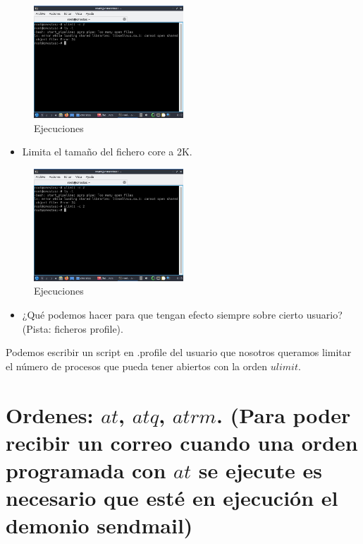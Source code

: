 \documentclass[12pt]{article}
\begin{document}
\begin{figure}[h]
    \centering
    \includegraphics[width=0.5\textwidth]{images/screenB07.jpg}
    \caption{Ejecuciones}
\end{figure}

\begin{itemize}
    \item Limita el tamaño del fichero core a 2K.
\end{itemize}

\begin{figure}[h]
    \centering
    \includegraphics[width=0.5\textwidth]{images/screenB08.jpg}
    \caption{Ejecuciones}
\end{figure}

\clearpage
\newpage

\begin{itemize}
    \item ¿Qué podemos hacer para que tengan efecto siempre sobre cierto
usuario? (Pista: ficheros profile).
\end{itemize}

Podemos escribir un script en .profile del usuario que nosotros queramos limitar el número de procesos que pueda tener abiertos con la orden $ulimit$.

\section{Ordenes: $at$, $atq$, $atrm$. (Para poder recibir un correo cuando una orden
programada con $at$ se ejecute es necesario que esté en ejecución el demonio sendmail)}
\end{document}
